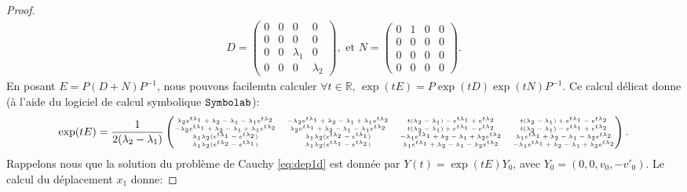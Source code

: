 \begin{proof}
\begin{align*}
    D = \begin{pmatrix}
        0 & 0 & 0 & 0 \\ 0 & 0 & 0 & 0 \\ 0 & 0 & \lambda_1 & 0 \\ 0 & 0 & 0 & \lambda_2
    \end{pmatrix}, \text{ et } N = \begin{pmatrix}
        0 & 1 & 0 & 0 \\ 0 & 0 & 0 & 0 \\ 0 & 0 & 0 & 0 \\ 0 & 0 & 0 & 0
    \end{pmatrix}.
\end{align*}
En posant $E = P(D+N)P^{-1}$, nous pouvons facilemtn calculer $\forall t \in \mathbb{R}$, $\exp(tE) = P\exp(tD)\exp(tN)P^{-1}$. Ce calcul délicat donne (à l'aide du logiciel de calcul symbolique $\verb|Symbolab|$):
\begin{align*}
    \exp(tE) = \tiny \frac{1}{2(\lambda_2 - \lambda_1)}\begin{pmatrix} 
        \lambda_2e^{t\lambda_1} + \lambda_2 - \lambda_1 - \lambda_1e^{t\lambda_2} & -\lambda_2e^{t\lambda_1} + \lambda_2 - \lambda_1 + \lambda_1e^{t\lambda_2} & t(\lambda_2 -\lambda_1) - e^{t\lambda_1} + e^{t\lambda_2} & t(\lambda_2 -\lambda_1) + e^{t\lambda_1} - e^{t\lambda_2} \\
         -\lambda_2e^{t\lambda_1} + \lambda_2 - \lambda_1 + \lambda_1e^{t\lambda_2} & \lambda_2e^{t\lambda_1} + \lambda_2 - \lambda_1 - \lambda_1e^{t\lambda_2} & t(\lambda_2 -\lambda_1) + e^{t\lambda_1} - e^{t\lambda_2} & t(\lambda_2 -\lambda_1) - e^{t\lambda_1} + e^{t\lambda_2} \\
          \lambda_1\lambda_2 (e^{t\lambda_1} - e^{t\lambda_2}) & \lambda_1\lambda_2 (e^{t\lambda_2} - e^{t\lambda_1})  & -\lambda_1e^{t\lambda_1} + \lambda_2 - \lambda_1 + \lambda_2e^{t\lambda_2} & \lambda_1e^{t\lambda_1} + \lambda_2 - \lambda_1 - \lambda_2e^{t\lambda_2} \\
          \lambda_1\lambda_2 (e^{t\lambda_2} - e^{t\lambda_1})  & \lambda_1\lambda_2 (e^{t\lambda_1} - e^{t\lambda_2})  & \lambda_1e^{t\lambda_1} + \lambda_2 - \lambda_1 - \lambda_2e^{t\lambda_2} & -\lambda_1e^{t\lambda_1} + \lambda_2 - \lambda_1 + \lambda_2e^{t\lambda_2}
    \end{pmatrix}.
\end{align*}
Rappelons nous que la solution du problème de Cauchy \cref{eq:dep1d} est donnée par $Y(t) = \exp(tE)Y_0$, avec $Y_0 = (0,0,v_0,-v'_0)$. Le calcul du déplacement $x_1$ donne:

\end{proof}
